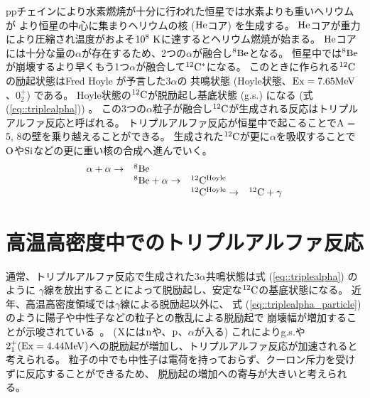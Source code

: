 ppチェインにより水素燃焼が十分に行われた恒星では水素よりも重いヘリウムが
より恒星の中心に集まりヘリウムの核 (${\rm He}$コア) を生成する。
${\rm He}$コアが重力により圧縮され温度がおよそ$10^8~{\rm K}$に達するとヘリウム燃焼が始まる。
${\rm He}$コアには十分な量の$\alpha$が存在するため、2つの$\alpha$が融合し${}^{8}{\rm Be}$となる。
恒星中では${}^{8}{\rm Be}$が崩壊するより早くもう1つ$\alpha$が融合して${}^{12}{\rm C}^{*}$になる。
このときに作られる${}^{12}{\rm C}$の励起状態はFred Hoyle が予言した$3\alpha$の
共鳴状態 (Hoyle状態、${\rm Ex} = 7.65{\rm MeV}$、$0_{2}^{+}$) である。
Hoyle状態の${}^{12}{\rm C}$が脱励起し基底状態 (g.s.) になる (式(\ref{eq::triplealpha})) 。
この3つの$\alpha$粒子が融合し${}^{12}{\rm C}$が生成される反応はトリプルアルファ反応と呼ばれる。
トリプルアルファ反応が恒星中で起こることでA = 5, 8の壁を乗り越えることができる。
生成された${}^{12}{\rm C}$が更に$\alpha$を吸収することで${\rm O}$や${\rm Si}$などの更に重い核の合成へ進んでいく。
\begin{equation}
  \begin{array}{llll}
    \alpha + \alpha \rightarrow & {}^{8}{\rm Be} & & \\
    & {}^{8}{\rm Be} + \alpha \rightarrow & {}^{12}{\rm C}^{{\rm Hoyle}} &\\
    & & {}^{12}{\rm C}^{{\rm Hoyle}} \rightarrow & {}^{12}{\rm C} + \gamma
  \end{array}\label{eq::triplealpha}
\end{equation}

\section{高温高密度中でのトリプルアルファ反応}
\label{seq::triplealphareaction}
通常、トリプルアルファ反応で生成された$3\alpha$共鳴状態は式 (\ref{eq::triplealpha}) のように
$\gamma$線を放出することによって脱励起し、安定な${}^{12}{\rm C}$の基底状態になる。
近年、高温高密度領域では$\gamma$線による脱励起以外に、
式 (\ref{eq::triplealpha_particle}) のように陽子や中性子などの粒子との散乱による脱励起で
崩壊幅が増加することが示唆されている~\cite{hotdensemedium}。
(${\rm X}$には${\rm n}$や、${\rm p}$、$\alpha$が入る)
これによりg.s.や$2_{1}^{+} ({\rm Ex} = 4.44 {\rm MeV}) $への脱励起が増加し、トリプルアルファ反応が加速されると考えられる。
粒子の中でも中性子は電荷を持っておらず、クーロン斥力を受けずに反応することができるため、
脱励起の増加への寄与が大きいと考えられる。

